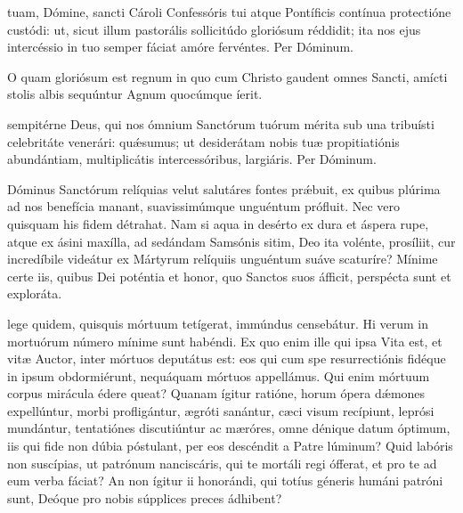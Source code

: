 \documentclass[fontsize=9pt,paper=A6,twoside,BCOR=1mm,DIV=22,headinclude]{scrarticle}
\begin{document}
\begin{multicols}{2}
\VRCPiii

 tuam, Dómine, sancti Cároli Confessóris tui atque Pontíficis contínua protectióne custódi: ut, sicut illum pastorális sollicitúdo gloriósum réddidit; ita nos ejus intercéssio in tuo semper fáciat amóre fervéntes. \red{(}Per Dóminum.\red{)}

{

\A O quam gloriósum est regnum in quo cum Christo gaudent omnes Sancti, amícti stolis albis sequúntur Agnum quocúmque íerit.

\VRMmiii 

 sempitérne Deus, qui nos ómnium Sanctórum tuórum mérita sub una tribuísti celebritáte venerári: quǽsumus; ut desiderátam nobis tuæ propitiatiónis abundántiam, multiplicátis intercessóribus, largiáris. Per Dóminum.


 Dóminus Sanctórum relíquias velut salutáres fontes pr\'æbuit, ex quibus plúrima ad nos benefícia manant, suavissimúmque unguéntum prófluit. Nec vero quisquam his fidem détrahat. Nam si aqua in desérto ex dura et áspera rupe, atque ex ásini maxílla, ad sedándam Samsónis sitim, Deo ita volénte, prosíliit, cur incredíbile videátur ex Mártyrum relíquiis unguéntum suáve scaturíre? Mínime certe iis, quibus Dei poténtia et honor, quo Sanctos suos áfficit, perspécta sunt et exploráta.

\RVMmiv

 lege quidem, quisquis mórtuum tetígerat, immúndus censebátur. Hi verum in mortuórum número mínime sunt habéndi. Ex quo enim ille qui ipsa Vita est, et vitæ Auctor, inter mórtuos deputátus est: eos qui cum spe resurrectiónis fidéque in ipsum obdormiérunt, nequáquam mórtuos appellámus. Qui enim mórtuum corpus mirácula édere queat? Quanam ígitur ratióne, horum ópera d\'æmones expellúntur, morbi profligántur, ægróti sanántur, cæci visum recípiunt, leprósi mundántur, tentatiónes discutiúntur ac mæróres, omne dénique datum óptimum, iis qui fide non dúbia póstulant, per eos descéndit a Patre lúminum? Quid labóris non suscípias, ut patrónum nanciscáris, qui te mortáli regi ófferat, et pro te ad eum verba fáciat? An non ígitur ii honorándi, qui totíus géneris humáni patróni sunt, Deóque pro nobis súpplices preces ádhibent?

}
\end{multicols}
\end{document}
